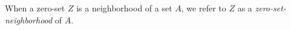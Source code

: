 When a zero-set $Z$ is a neighborhood of a set $A$, we refer to $Z$ as a \emph{zero-set-neighborhood} of $A$.
